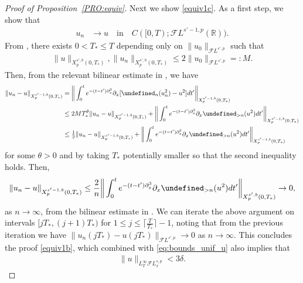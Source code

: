 \documentclass[a4paper,
11pt,  reqno]{amsart}
\newcommand{\5}{\textup{V}}
\newcommand{\FL}{\mathcal{F} L}
\newcommand{\dl}{\delta}
\newcommand{\dx}{\partial_x}
\theoremstyle{remark}
\newcommand{\R}{\mathbb{R}}
\let\P= \undefined
\newcommand{\P}{\mathbf{P}}
\newcommand{\ta}{\theta}
\numberwithin{equation}{section}
\numberwithin{theorem}{section}
\begin{document}
\begin{proof}[Proof of Proposition~\ref{PRO:equiv}]
Next we show \eqref{equiv1c}.
As a first step, we show that
\begin{align}
\label{equiv1b}
u_n & \to u \quad \text{in} \quad    C([0,T); \FL^{s'-1,p}(\R)).
\end{align}
From \cite{Grunrock_ldv_hier}, there exists $0< T_* \le T$ depending only on $\| u_0\|_{\FL^{s',p}}$ such that
\begin{align}
\| u\|_{X^{s',b}_p(0,T_*)}, \| u_n\|_{X^{s',b}_p(0,T_*)} \le 2 \| u_0\|_{\FL^{s',p}} =: M.
\end{align}
Then, from the relevant bilinear estimate in \cite{Grunrock_ldv_hier}, we have
\begin{align}
\| u_n - u\|_{X^{s'-1,b}_p(0,T_*)}
&
= \bigg\| \int_0^t e^{-(t-t')\dx^3} \dx [ \P_n (u_n^2) - u^2 ] dt' \bigg\|_{X^{s'-1,b}_p(0,T_*)}
\\
&
\le 2M T_*^\ta \| u_n - u \|_{X^{s'-1,b}_p(0,T_*)} + \bigg\| \int_0^t e^{-(t-t')\dx^3} \dx \P_{>n} (u^2)  dt' \bigg\|_{X^{s'-1,b}_p(0,T_*)}
\\
&
\le \tfrac12 \| u_n - u \|_{X^{s'-1,b}_p(0,T_*)} + \bigg\| \int_0^t e^{-(t-t')\dx^3} \dx \P_{>n} (u^2)  dt' \bigg\|_{X^{s'-1,b}_p(0,T_*)}
\end{align}
for some $\ta>0$ and by taking $T_*$ potentially smaller so that the second inequality holds. Then,
\begin{align}
\| u_n - u\|_{X^{s'-1,b}_p(0,T_*)}
\le \frac2n  \bigg\| \int_0^t e^{-(t-t')\dx^3} \dx \P_{>n} (u^2)  dt' \bigg\|_{X^{s',b}_p(0,T_*)} \to 0 ,
\end{align}
as $n\to\infty$, from the bilinear estimate in \cite{Grunrock_ldv_hier}.
We can iterate the above argument on intervals $[ jT_*, (j+1)T_* )$ for $1 \le j \le \lceil \frac{T}{T_*} \rceil -1 $, noting that from the previous iteration we have $\| u_n( jT_*) - u(jT_*) \|_{\FL^{s',p}} \to 0$ as $n\to\infty$. This concludes the proof \eqref{equiv1b}, which combined with \eqref{eq:bounds_unif_u} also implies that
\begin{align}
\label{equiv1bb}
\| u \|_{L^\infty_T \FL^{s,p}_x} < 3 \dl .
\end{align}





\end{proof}
\end{document}
